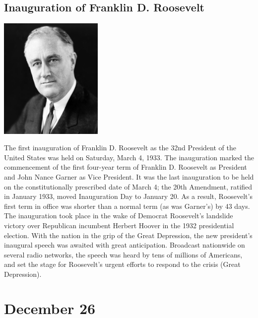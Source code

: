 \documentclass[11pt]{report}
\begin{document}
\subsection{Inauguration of Franklin D. Roosevelt}
\vspace{2mm}\begin{center}\includegraphics[width=5cm]{./img/roosevelt.jpg}\end{center}
The first inauguration of Franklin D. Roosevelt as the 32nd President of the United States was held on Saturday, March 4, 1933. The inauguration marked the commencement of the first four-year term of Franklin D. Roosevelt as President and John Nance Garner as Vice President. It was the last inauguration to be held on the constitutionally prescribed date of March 4; the 20th Amendment, ratified in January 1933, moved Inauguration Day to January 20. As a result, Roosevelt's first term in office was shorter than a normal term (as was Garner's) by 43 days.\\
The inauguration took place in the wake of Democrat Roosevelt's landslide victory over Republican incumbent Herbert Hoover in the 1932 presidential election. With the nation in the grip of the Great Depression, the new president's inaugural speech was awaited with great anticipation. Broadcast nationwide on several radio networks, the speech was heard by tens of millions of Americans, and set the stage for Roosevelt's urgent efforts to respond to the crisis (Great Depression).
\section{December 26}
\end{document}
